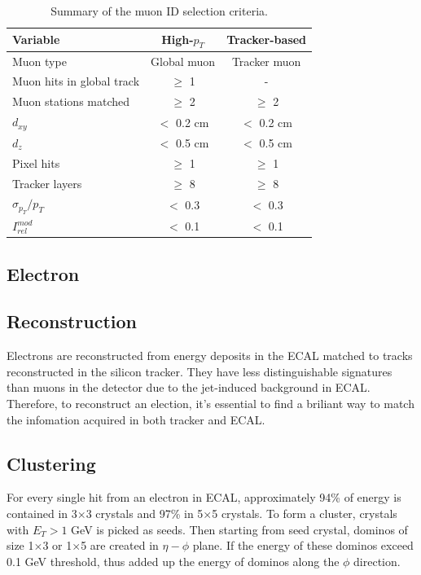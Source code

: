 \begin{table}[h]
  \begin{center}
    \begin{tabular}{|l|c|c|}
      \hline
      Variable & High-$p_{T}$ & Tracker-based \\ \hline
      Muon type & Global muon & Tracker muon \\
      Muon hits in global track & $\geq$ 1 & - \\
      Muon stations matched & $\geq$ 2 & $\geq$ 2 \\
      $d_{xy}$ & $<$ 0.2 cm & $<$ 0.2 cm\\
      $d_{z}$ & $<$ 0.5 cm & $<$ 0.5 cm\\
      Pixel hits & $\geq$ 1 & $\geq$ 1 \\
      Tracker layers & $\geq$ 8 & $\geq$ 8 \\
      $\sigma_{p_{T}}/p_{T}$ & $<$ 0.3 & $<$ 0.3 \\ \hline
      $I_{rel}^{mod}$  & $<$ 0.1 & $<$ 0.1 \\
      \hline
    \end{tabular}
    \caption{\label{tab:MuonIDtable} Summary of the muon ID selection criteria.}
  \end{center}
\end{table}

\newpage
\subsection{Electron}

\subsection*{Reconstruction}
Electrons are reconstructed from energy deposits in the ECAL matched to tracks reconstructed in the silicon tracker. They have less distinguishable signatures than muons in the detector due to the jet-induced background in ECAL. Therefore, to reconstruct an election, it's essential to find a briliant way to match the infomation acquired in both tracker and ECAL.

\subsection*{Clustering}
For every single hit from an electron in ECAL, approximately 94\% of energy is contained in 3$\times$3 crystals and 97\% in 5$\times$5 crystals. To form a cluster, crystals with $E_{T} > 1$ GeV is picked as seeds. Then starting from seed crystal, dominos of size 1$\times$3 or 1$\times$5 are created in $\eta-\phi$ plane. If the energy of these dominos exceed 0.1 GeV threshold, thus added up the energy of dominos along the $\phi$ direction.

